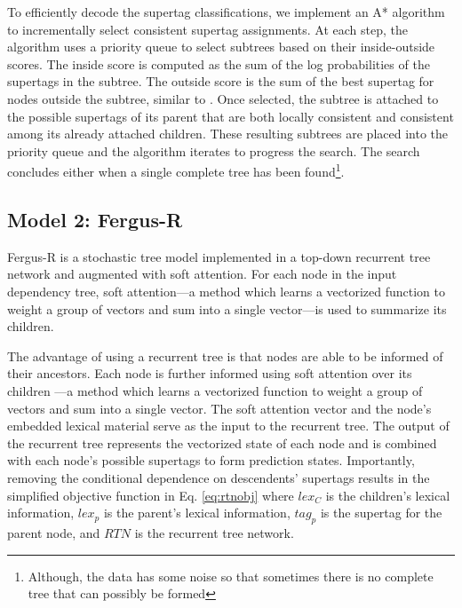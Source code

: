 \documentclass[11pt]{article}
\begin{document}
To efficiently decode the supertag classifications, we implement an A* algorithm to incrementally select consistent supertag assignments.
%
At each step, the algorithm uses a priority queue to select subtrees based on their inside-outside scores.
%
The inside score is computed as the sum of the log probabilities of the supertags in the subtree.
%
The outside score is the sum of the best supertag for nodes outside the subtree, similar to .
%
Once selected, the subtree is attached to the possible supertags of its parent that are both locally consistent and consistent among its already attached children.
%
These resulting subtrees are placed into the priority queue and the algorithm iterates to progress the search.
%
The search concludes either when a single complete tree has been found\footnote{Although, the data has some noise so that sometimes there is no complete tree that can possibly be formed}.


\subsection{Model 2: Fergus-R}

Fergus-R is a stochastic tree model implemented in a top-down recurrent tree network and augmented with soft attention.
%
For each node in the input dependency tree, soft attention---a method which learns a vectorized function to weight a group of vectors and sum into a single vector---is used to summarize its children.
%

The advantage of using a recurrent tree is that nodes are able to be informed of their ancestors.
%
Each node is further informed using soft attention over its children ---a method which learns a vectorized function to weight a group of vectors and sum into a single vector.
%
The soft attention vector and the node's embedded lexical material serve as the input to the recurrent tree.
%
The output of the recurrent tree represents the vectorized state of each node and is combined with each node's possible supertags to form prediction states.
%
%
%
Importantly, removing the conditional dependence on descendents' supertags
results in the simplified objective function in Eq. \ref{eq:rtnobj} where $lex_C$ is the children's lexical information, $lex_p$ is the parent's lexical information, $tag_p$ is the supertag for the parent node, and $RTN$ is the recurrent tree network. 
\end{document}
